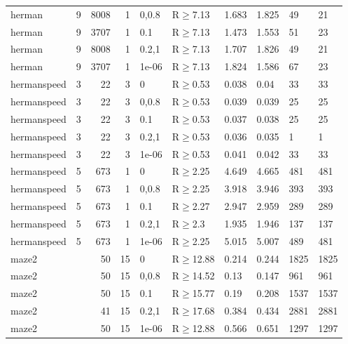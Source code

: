 \begin{longtable}{llrrllllll}
 herman        & 9        &   	8008 &   1 & 0,0.8 & R$\geq$7.13  & 1.683  & 1.825   & 49      & 21   \\
 herman        & 9        &   	3707 &   1 & 0.1   & R$\geq$7.13  & 1.473  & 1.553   & 51      & 23   \\
 herman        & 9        &   	8008 &   1 & 0.2,1 & R$\geq$7.13  & 1.707  & 1.826   & 49      & 21   \\
 herman        & 9        &   	3707 &   1 & 1e-06 & R$\geq$7.13  & 1.824  & 1.586   & 67      & 23   \\
 hermanspeed   & 3        &     	22 &   3 & 0     & R$\geq$0.53  & 0.038  & 0.04    & 33      & 33   \\
 hermanspeed   & 3        &     	22 &   3 & 0,0.8 & R$\geq$0.53  & 0.039  & 0.039   & 25      & 25   \\
 hermanspeed   & 3        &     	22 &   3 & 0.1   & R$\geq$0.53  & 0.037  & 0.038   & 25      & 25   \\
 hermanspeed   & 3        &     	22 &   3 & 0.2,1 & R$\geq$0.53  & 0.036  & 0.035   & 1       & 1    \\
 hermanspeed   & 3        &     	22 &   3 & 1e-06 & R$\geq$0.53  & 0.041  & 0.042   & 33      & 33   \\
 hermanspeed   & 5        &    	673 &   1 & 0     & R$\geq$2.25  & 4.649  & 4.665   & 481     & 481  \\
 hermanspeed   & 5        &    	673 &   1 & 0,0.8 & R$\geq$2.25  & 3.918  & 3.946   & 393     & 393  \\
 hermanspeed   & 5        &    	673 &   1 & 0.1   & R$\geq$2.27  & 2.947  & 2.959   & 289     & 289  \\
 hermanspeed   & 5        &    	673 &   1 & 0.2,1 & R$\geq$2.3   & 1.935  & 1.946   & 137     & 137  \\
 hermanspeed   & 5        &    	673 &   1 & 1e-06 & R$\geq$2.25  & 5.015  & 5.007   & 489     & 481  \\
 maze2         &          &     	50 &  15 & 0     & R$\geq$12.88 & 0.214  & 0.244   & 1825    & 1825 \\
 maze2         &          &     	50 &  15 & 0,0.8 & R$\geq$14.52 & 0.13   & 0.147   & 961     & 961  \\
 maze2         &          &     	50 &  15 & 0.1   & R$\geq$15.77 & 0.19   & 0.208   & 1537    & 1537 \\
 maze2         &          &     	41 &  15 & 0.2,1 & R$\geq$17.68 & 0.384  & 0.434   & 2881    & 2881 \\
 maze2         &          &     	50 &  15 & 1e-06 & R$\geq$12.88 & 0.566  & 0.651   & 1297    & 1297 \\

\end{longtable}
